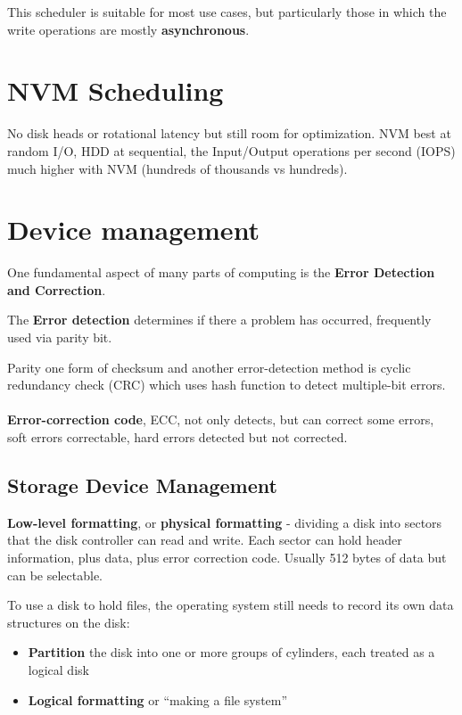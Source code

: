 This scheduler is suitable for most use cases, but particularly those in which the
write operations are mostly \textbf{asynchronous}.


\section{NVM Scheduling}
No disk heads or rotational latency but still room for optimization. NVM best at random I/O, HDD at sequential, the Input/Output operations per second (IOPS) much higher with NVM (hundreds of thousands vs hundreds).


\section{Device management}

One fundamental aspect of many parts of computing is the \textbf{Error Detection and Correction}. 

The \textbf{Error detection} determines if there a problem has occurred, frequently used via parity bit. 

Parity one form of checksum and another error-detection method is cyclic
redundancy check (CRC) which uses hash function to detect
multiple-bit errors.

\paragraph{}

\textbf{Error-correction code}, ECC, not only detects, but can correct some
errors, soft errors correctable, hard errors detected but not corrected.


\subsection{Storage Device Management}

\textbf{Low-level formatting}, or \textbf{physical formatting} - dividing a disk into
sectors that the disk controller can read and write. Each sector can hold header information, plus data, plus error
correction code. Usually 512 bytes of data but can be selectable.

To use a disk to hold files, the operating system still needs to record its
own data structures on the disk:

\begin{itemize}
    \item \textbf{Partition} the disk into one or more groups of cylinders, each treated as a logical disk
    \item \textbf{Logical formatting} or “making a file system”
\end{itemize}

